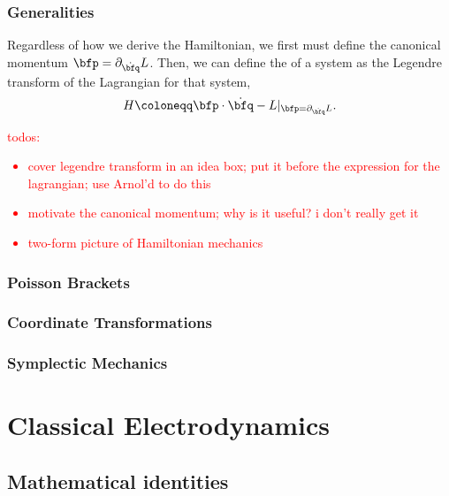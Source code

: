 \documentclass[11pt]{article}
\begin{document}
\subsubsection{Generalities}

Regardless of how we derive the Hamiltonian, we first
must define the canonical momentum $\bfp = \partial_{\dot{\bfq}} L$.
Then, we can define the  of a system as the Legendre 
transform of the Lagrangian for that system,
\begin{align*}
    H \coloneqq \bfp \cdot \dot{\bfq} - L|_{\bfp = \partial_{\dot{\bfq}} L}.
\end{align*}

\textcolor{red}{todos:
\begin{itemize}
    \item cover legendre transform in an idea box; put it before the expression
    for the lagrangian; use Arnol'd to do this
    \item motivate the canonical momentum; why is it useful? i don't really get it
    \item two-form picture of Hamiltonian mechanics
\end{itemize}}

\subsubsection{Poisson Brackets}

\subsubsection{Coordinate Transformations}

\subsubsection{Symplectic Mechanics}

\newpage

\section{Classical Electrodynamics}

\subsection{Mathematical identities}
\end{document}
